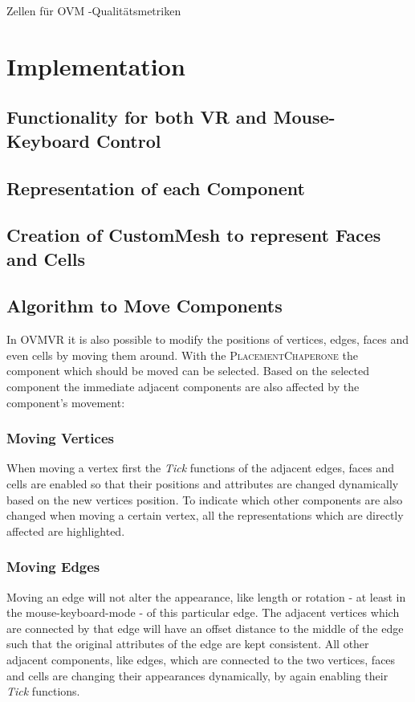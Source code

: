 \documentclass{report}
\begin{document}
	Zellen für OVM
		-Qualitätsmetriken
		
\chapter{Implementation}
	\section{Functionality for both VR and Mouse-Keyboard Control}
	\startsection
	\closesection
	\section{Representation of each Component}
	\startsection
	\closesection
	\section{Creation of CustomMesh to represent Faces and Cells}
	\startsection
	\closesection
	\section{Algorithm to Move Components}
	\startsection
		In OVMVR it is also possible to modify the positions of vertices, edges, faces and even cells by moving them around. With the \textsc{PlacementChaperone} the component which should be moved can be selected. Based on the selected component the immediate adjacent components are also affected by the component's movement:
		\subsection{Moving Vertices}
		\startsubsection
			When moving a vertex first the \textit{Tick} functions of the adjacent edges, faces and cells are enabled so that their positions and attributes are changed dynamically based on the new vertices position. To indicate which other components are also changed when moving a certain vertex, all the representations which are directly affected are highlighted.
		\closesection
		\subsection{Moving Edges}
		\startsubsection
			Moving an edge will not alter the appearance, like length or rotation - at least in the mouse-keyboard-mode - of this particular edge. The adjacent vertices which are connected by that edge will have an offset distance to the middle of the edge such that the original attributes of the edge are kept consistent. All other adjacent components, like edges, which are connected to the two vertices, faces and cells are changing their appearances dynamically, by again enabling their \textit{Tick} functions.
		\closesection
\end{document}
